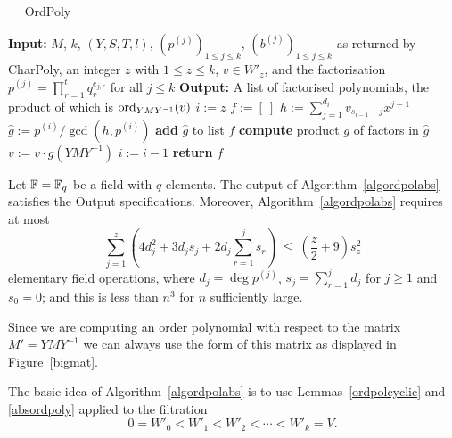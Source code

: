 \begin{algorithm}
\caption{$\quad$ \sc OrdPoly}
\label{algordpolabs}
\begin{algorithmic}
\STATE \textbf{Input:} $M$, $k$, $(Y,S,T,l)$, $(p^{(j)})_{1 \le j \le k}$,
$(b^{(j)})_{1 \le j \le k}$ as returned by {\sc CharPoly}, an integer
$z$ with $1 \le z \le k$,
$v \in W'_z$, and the factorisation  
$p^{(j)} = \prod_{r=1}^t q_r^{e_{j,r}}$ for all $j\leq k$
\STATE \textbf{Output:} A list of factorised polynomials, the product
of which is $\mathrm{ord}_{YMY^{-1}}(v)$ 
\vspace*{2mm}
\STATE $i := z$ \hspace*{1cm} 
\STATE $f := [\ ]$ \hspace*{1cm} 
\REPEAT
    \STATE $h := \sum_{j=1}^{d_i} v_{s_{i-1}+j} x^{j-1}$
    \STATE $\hat g := p^{(i)}/\gcd(h,p^{(i)})$ \hspace*{1cm} 
        \STATE \textbf{add} $\hat g$ to list $f$
        \STATE \textbf{compute} product $g$ of factors in $\hat g$
            \STATE $v := v \cdot g(YMY^{-1})$ \hspace*{1cm} 
        \ENDIF
    \ENDIF
    \STATE $i := i - 1$
\STATE \textbf{return} $f$
\end{algorithmic}
\end{algorithm}

\begin{Prop}
\label{propordpol}

\mbox{}\par
Let $\mathbb{F} = \mathbb{F}_q$ be a field with $q$ elements.
The output of Algorithm~\ref{algordpolabs} satisfies the Output specifications.
Moreover, Algorithm~\ref{algordpolabs}
requires at most
\[
\sum_{j=1}^{z} 
  \left( 4 d_j^2  + 3d_j s_j + 2d_j \sum_{r=1}^j s_r \right)
\ \leq\ (\frac{z}{2}+9)s_z^2
\]
elementary field operations, 
where $d_j=\deg p^{(j)}$, $s_j=\sum_{r=1}^j d_j$ for $j\geq1$ and
$s_0=0$; and this is less than $n^3$ for $n$ sufficiently large.

\end{Prop}
\proofbeg
Since we are computing an order polynomial with respect to the matrix
$M' = YMY^{-1}$ we can always use the form of this matrix as displayed
in Figure~\ref{bigmat}.

The basic idea of Algorithm~\ref{algordpolabs} is to use
Lemmas~\ref{ordpolcyclic} and \ref{absordpoly} applied to the filtration
\[ 0 = W'_0 < W'_1 < W'_2 < \cdots < W'_k = V. \]


